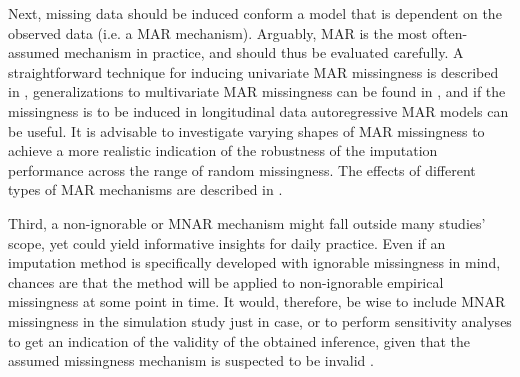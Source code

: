 \documentclass[bimj,fleqn]{w-art}
\begin{document}
Next, missing data should be induced conform a model that is dependent on the observed data (i.e. a MAR mechanism). Arguably, MAR is the most often-assumed mechanism in practice, and should thus be evaluated carefully. A straightforward technique for inducing univariate MAR missingness is described in \citet[][p. 63]{fimd}, generalizations to multivariate MAR missingness can be found in \citet{ampute}, and if the missingness is to be induced in longitudinal data autoregressive MAR models \citep[e.g. cf.][model 2 and model 3]{shara2015randomly} can be useful. It is advisable to investigate varying shapes of MAR missingness to achieve a more realistic indication of the robustness of the imputation performance across the range of random missingness. The effects of different types of MAR mechanisms are described in \citet{scho18}.%

Third, a non-ignorable or MNAR mechanism might fall outside many studies' scope, yet could yield informative insights for daily practice. Even if an imputation method is specifically developed with ignorable missingness in mind, chances are that the method will be applied to non-ignorable empirical missingness at some point in time. It would, therefore, be wise to include MNAR missingness in the simulation study just in case, or to perform sensitivity analyses to get an indication of the validity of the obtained inference, given that the assumed missingness mechanism is suspected to be invalid \citep[see e.g.][part 5]{molenberghs2014handbook}.
\end{document}
